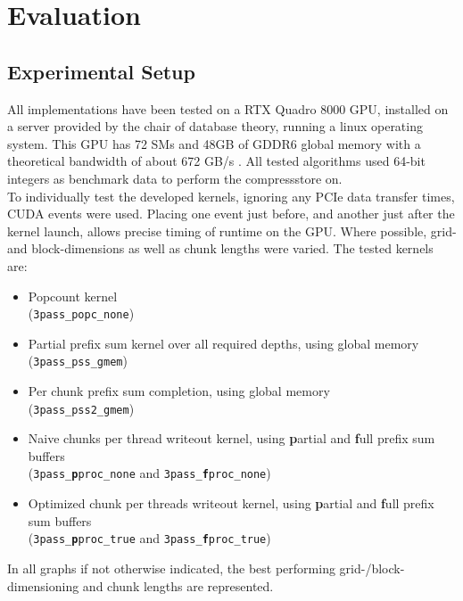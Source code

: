 \documentclass{tudscrreprt}
\begin{document}
	\chapter{Evaluation}
	
		\section{Experimental Setup}
			All implementations have been tested on a RTX Quadro 8000 GPU, installed on a server provided by the chair of database theory, running a linux operating system. This GPU has 72 SMs and 48GB of GDDR6 global memory with a theoretical bandwidth of about 672 GB/s \cite{quadrortx8000_specs}. All tested algorithms used 64-bit integers as benchmark data to perform the compressstore on. \\
			
			To individually test the developed kernels, ignoring any PCIe data transfer times, CUDA events were used. Placing one event just before, and another just after the kernel launch, allows precise timing of runtime on the GPU. Where possible, grid- and block-dimensions as well as chunk lengths were varied. The tested kernels are:\\
			\begin{itemize}
				\item Popcount kernel \\ (\texttt{3pass\_popc\_none})
				\item Partial prefix sum kernel over all required depths, using global memory \\ (\texttt{3pass\_pss\_gmem})
				\item Per chunk prefix sum completion, using global memory \\ (\texttt{3pass\_pss2\_gmem})
				\item Naive chunks per thread writeout kernel, using \textbf{p}artial and \textbf{f}ull prefix sum buffers \\ (\texttt{3pass\_\textbf{p}proc\_none} and \texttt{3pass\_\textbf{f}proc\_none})
				\item Optimized chunk per threads writeout kernel, using \textbf{p}artial and \textbf{f}ull prefix sum buffers \\ (\texttt{3pass\_\textbf{p}proc\_true} and \texttt{3pass\_\textbf{f}proc\_true})
			\end{itemize}
			In all graphs if not otherwise indicated, the best performing grid-/block-dimensioning and chunk lengths are represented. \\
			
\end{document}

